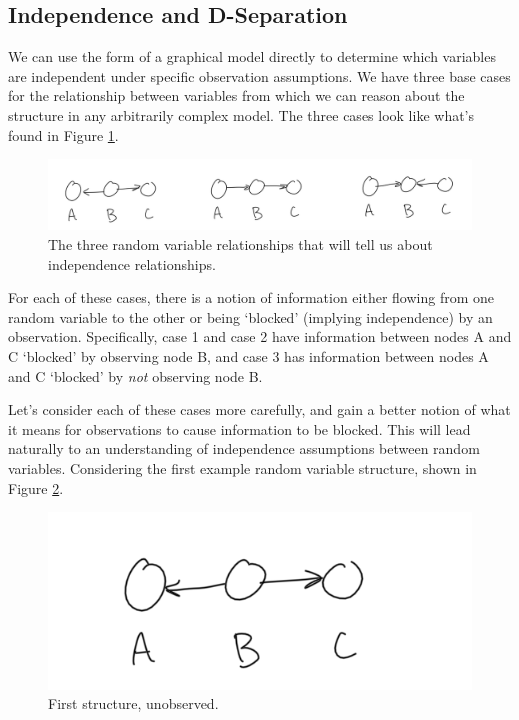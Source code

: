 \subsection{Independence and D-Separation}
We can use the form of a graphical model directly to determine which variables are independent under specific observation assumptions. We have three base cases for the relationship between variables from which we can reason about the structure in any arbitrarily complex model. The three cases look like what's found in Figure \ref{fig:indep-structure}.
\begin{figure}
	\centering
	\includegraphics[width=0.5\paperwidth]{../GraphicalModels/fig/indep-structure.png}
    \caption{The three random variable relationships that will tell us about independence relationships.}
	\label{fig:indep-structure}
\end{figure}
For each of these cases, there is a notion of information either flowing from one random variable to the other or being `blocked' (implying independence) by an observation. Specifically, case 1 and case 2 have information between nodes A and C `blocked' by observing node B, and case 3 has information between nodes A and C `blocked' by \textit{not} observing node B.

Let's consider each of these cases more carefully, and gain a better notion of what it means for observations to cause information to be blocked. This will lead naturally to an understanding of independence assumptions between random variables. Considering the first example random variable structure, shown in Figure \ref{fig:first-case-unobserved}.

\begin{figure}
	\centering
	\includegraphics[width=0.5\paperwidth]{../GraphicalModels/fig/first-case-unobserved.png}
	\caption{First structure, unobserved.}
	\label{fig:first-case-unobserved}
\end{figure}

